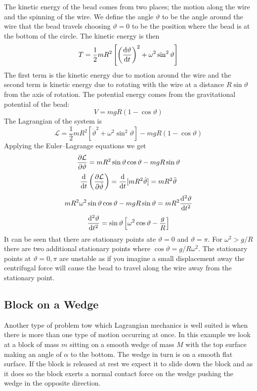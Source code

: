 \documentclass{article}
\newcommand{\LL}{\mathcal{L}}
\begin{document}
    The kinetic energy of the bead comes from two places;
    the motion along the wire and the spinning of the wire.
    We define the angle \(\vartheta\) to be the angle around the wire that the bead travels choosing \(\vartheta = 0\) to be the position where the bead is at the bottom of the circle.
    The kinetic energy is then
    \[T = \frac{1}{2}mR^2\left[\left(\dv{\vartheta}{t}\right)^2 + \omega^2\sin^2\vartheta\right]\]
    The first term is the kinetic energy due to motion around the wire and the second term is kinetic energy due to rotating with the wire at a distance \(R\sin\vartheta\) from the axis of rotation.
    The potential energy comes from the gravitational potential of the bead:
    \[V = mgR(1 - \cos\vartheta)\]
    The Lagrangian of the system is
    \[\LL = \frac{1}{2}mR^2[\dot\vartheta^2 + \omega^2\sin^2\vartheta] - mgR(1 - \cos\vartheta)\]
    Applying the Euler--Lagrange equations we get
    \[\pdv{\LL}{\vartheta} = mR^2\sin\vartheta\cos\vartheta - mgR\sin\vartheta\]
    \[\dv{t}\left(\pdv{\LL}{\dot\vartheta}\right) = \dv{t}[mR^2\dot\vartheta] = mR^2\ddot\vartheta\]
    \[mR^2\omega^2\sin\vartheta\cos\vartheta - mgR\sin\vartheta = mR^2\dv[2]{\vartheta}{t}\]
    \[\dv[2]{\vartheta}{t} = \sin\vartheta\left[\omega^2\cos\vartheta - \frac{g}{R}\right]\]
    It can be seen that there are stationary points ate \(\vartheta = 0\) and \(\vartheta = \pi\).
    For \(\omega^2 > g/R\) there are two additional stationary points where \(\cos\vartheta = g/R\omega^2\).
    The stationary points at \(\vartheta = 0, \pi\)  are unstable as if you imagine a small displacement away the centrifugal force will cause the bead to travel along the wire away from the stationary point.
    
    \subsection{Block on a Wedge}
    Another type of problem tow which Lagrangian mechanics is well suited is when there is more than one type of motion occurring at once.
    In this example we look at a block of mass \(m\) sitting on a smooth wedge of mass \(M\) with the top surface making an angle of \(\alpha\) to the bottom.
    The wedge in turn is on a smooth flat surface.
    If the block is released at rest we expect it to slide down the block and as it does so the block exerts a normal contact force on the wedge pushing the wedge in the opposite direction.
    
\end{document}
